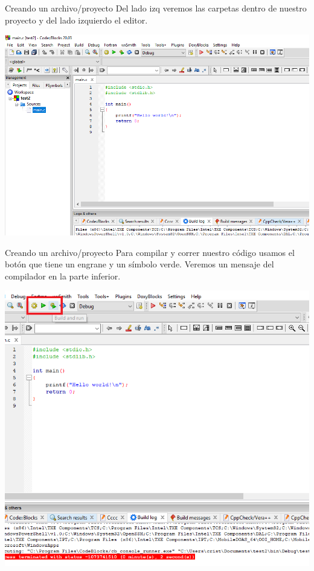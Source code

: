 \documentclass[11pt]{beamer}
\begin{document}
\begin{frame}{Creando un archivo/proyecto}
    \justifying
    Del lado izq veremos las carpetas dentro de nuestro proyecto y del lado izquierdo el editor.
    
    \centering
    \includegraphics[width=\textwidth]{cb30_1.png}
\end{frame}
\begin{frame}{Creando un archivo/proyecto}
    \justifying
    Para compilar y correr nuestro código usamos el botón que tiene un engrane y un símbolo verde. Veremos un mensaje del compilador en la parte inferior.
    
    \centering
    \includegraphics[scale=0.35]{cb31_1.png}
\end{frame}
\end{document}
